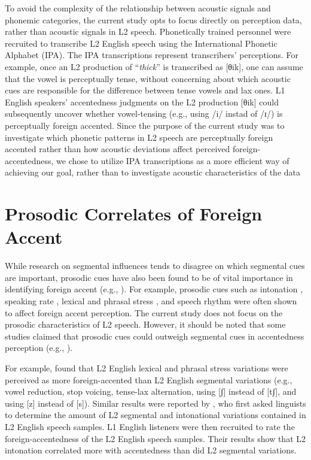 To avoid the complexity of the relationship between acoustic signals and phonemic categories, the current study opts to focus directly on perception data, rather than acoustic signals in L2 speech. Phonetically trained personnel were recruited to transcribe L2 English speech using the International Phonetic Alphabet (IPA). The IPA transcriptions represent transcribers’ perceptions. For example, once an L2 production of “\textit{thick}” is transcribed as [θik], one can assume that the vowel is perceptually tense, without concerning about which acoustic cues are responsible for the difference between tense vowels and lax ones. L1 English speakers’ accentedness judgments on the L2  production [θik] could subsequently uncover whether vowel-tensing (e.g., using /i/ instad of /ɪ/) is perceptually foreign accented. Since the purpose of the current study was to investigate which phonetic patterns in L2 speech are perceptually foreign accented rather than how acoustic deviations affect perceived foreign-accentedness, we chose to utilize IPA transcriptions as a more efficient way of achieving our goal, rather than to investigate acoustic characteristics of the data 

\section{Prosodic Correlates of Foreign Accent}

While research on segmental influences tends to disagree on which segmental cues are important, prosodic cues have also been found to be of vital importance in identifying foreign accent (e.g., \citealp{Hahn_2004, Kang_2010, Munro_2001, Zielinski_2008}). For example, prosodic cues such as intonation \citep{AndersonHsieh_1992, Jilka_2000}, speaking rate \citep{Munro_2001}, lexical and phrasal stress \citep{Kang_2010}, and speech rhythm \citep{White_2007} were often shown to affect foreign accent perception. The current study does not focus on the prosodic characteristics of L2 speech. However, it should be noted that some studies claimed that prosodic cues could outweigh segmental cues in accentedness perception (e.g., \citealp{Magen_1998, Munro_1995}).

For example, \citet{Magen_1998} found that L2 English lexical and phrasal stress variations were perceived as more foreign-accented than L2 English segmental variations (e.g., vowel reduction, stop voicing, tense-lax alternation, using [ʃ] instead of [tʃ], and using [z] instead of [s]). Similar results were reported by \citet{Munro_1995}, who first asked linguists to determine the amount of L2 segmental and intonational variations contained in L2 English speech samples. L1 English listeners were then recruited to rate the foreign-accentedness of the L2 English speech samples. Their results show that L2 intonation correlated more with accentedness than did L2 segmental variations. 

